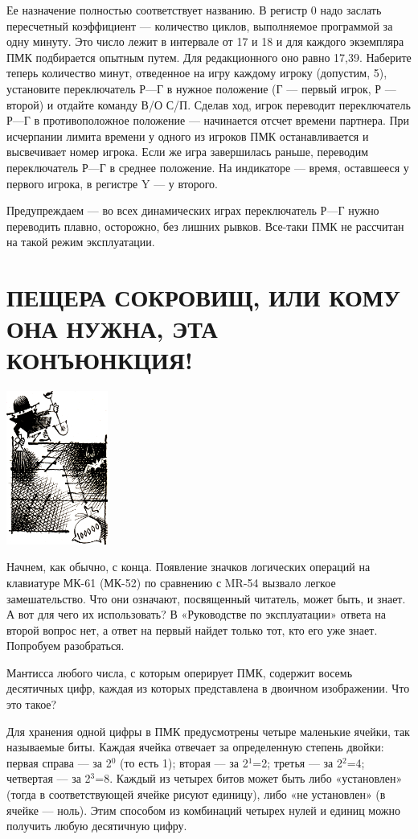\documentclass[11pt,a4paper,oneside]{article}
\begin{document}
Ее назначение полностью соответствует названию. В регистр 0 надо заслать пересчетный коэффициент — количество циклов, выполняемое программой за одну минуту. Это число лежит в интервале от 17 и 18 и для каждого экземпляра ПМК подбирается опытным путем. Для редакционного оно равно 17,39. Наберите теперь количество минут, отведенное на игру каждому игроку (допустим, 5), установите переключатель Р—Г в нужное положение (Г — первый игрок, Р — второй) и отдайте команду В/О С/П. Сделав ход, игрок переводит переключатель Р—Г в противоположное положение — начинается отсчет времени партнера. При исчерпании лимита времени у одного из игроков ПМК останавливается и высвечивает номер игрока. Если же игра завершилась раньше, переводим переключатель Р—Г в среднее положение. На индикаторе — время, оставшееся у первого игрока, в регистре Y — у второго.

Предупреждаем — во всех динамических играх переключатель Р—Г нужно переводить плавно, осторожно, без лишних рывков. Все-таки ПМК не рассчитан на такой режим эксплуатации.

\section{ПЕЩЕРА СОКРОВИЩ, ИЛИ КОМУ ОНА НУЖНА, ЭТА КОНЪЮНКЦИЯ!}
\includegraphics[width=0.25\textwidth]{treasure1}

Начнем, как обычно, с конца. Появление значков логических операций на клавиатуре МК-61 (МК-52) по сравнению с MR-54 вызвало легкое замешательство. Что они означают, посвященный читатель, может быть, и знает. А вот для чего их использовать? В «Руководстве по эксплуатации» ответа на второй вопрос нет, а ответ на первый найдет только тот, кто его уже знает. Попробуем разобраться.

Мантисса любого числа, с которым оперирует ПМК, содержит восемь десятичных цифр, каждая из которых представлена в двоичном изображении. Что это такое?

Для хранения одной цифры в ПМК предусмотрены четыре маленькие ячейки, так называемые биты. Каждая ячейка отвечает за определенную степень двойки: первая справа — за 2$^{0}$ (то есть 1); вторая — за 2$^{1}$=2; третья — за 2$^{2}$=4; четвертая — за 2$^{3}$=8. Каждый из четырех битов может быть либо «установлен» (тогда в соответствующей ячейке рисуют единицу), либо «не установлен» (в ячейке — ноль). Этим способом из комбинаций четырех нулей и единиц можно получить любую десятичную цифру.
\end{document}
